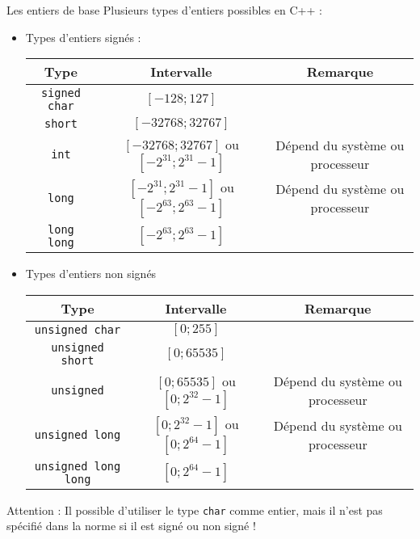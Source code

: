 \documentclass[compress,10pt,aspectratio=169]{beamer}
\begin{document}
\begin{frame}[fragile]{Les entiers de base}
    \scriptsize 
    Plusieurs types d'entiers possibles en C++ :
    \begin{itemize}
    \item Types d'entiers signés :
    \begin{tabular}{|c|c|c|}\hline
    Type & Intervalle & Remarque \\ \hline \hline
    \texttt{signed char} & $[-128;127]$ & \\ \hline
    \texttt{short} & $[-32768;32767]$ & \\ \hline
    \texttt{int} & $[-32768;32767]$ ou $[-2^{31};2^{31}-1]$ & Dépend du système ou processeur\\ \hline
    \texttt{long} & $[-2^{31};2^{31}-1]$ ou $[-2^{63};2^{63}-1]$ & Dépend du système ou processeur\\ \hline
    \texttt{long long} & $[-2^{63};2^{63}-1]$ & \\ \hline
    \end{tabular}
    \item Types d'entiers non signés
    \begin{tabular}{|c|c|c|}\hline
        Type & Intervalle & Remarque \\ \hline \hline
        \texttt{unsigned char} & $[0;255]$ & \\ \hline
        \texttt{unsigned short} & $[0;65535]$ & \\ \hline
        \texttt{unsigned} & $[0;65535]$ ou $[0;2^{32}-1]$ & Dépend du système ou processeur\\ \hline
        \texttt{unsigned long} & $[0;2^{32}-1]$ ou $[0;2^{64}-1]$ & Dépend du système ou processeur\\ \hline
        \texttt{unsigned long long} & $[0;2^{64}-1]$ & \\ \hline
    \end{tabular}
    \end{itemize}
    \alert{Attention} : Il possible d'utiliser le type \texttt{char} comme entier, mais il n'est pas spécifié dans la norme si il est signé ou non signé !
\end{frame}
\end{document}
